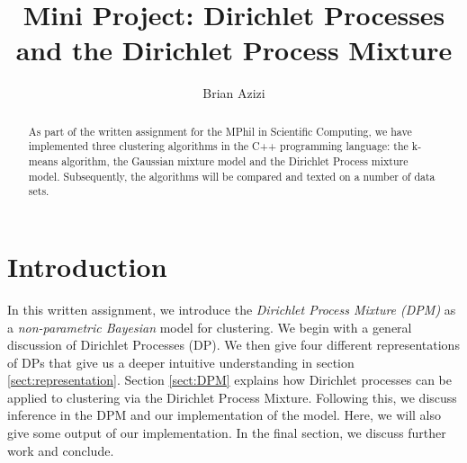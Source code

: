 \documentclass[final,3p,times,twocolumn]{elsarticle}
\begin{document}
\begin{frontmatter}



\title{Mini Project: Dirichlet Processes and the Dirichlet Process Mixture}


\author{Brian Azizi}

\address{Cavendish Laboratory, Department of Physics, J J Thomson
  Avenue, Cambridge. CB3 0HE}

\begin{abstract}
As part of the written assignment for the MPhil in Scientific Computing, we have implemented three clustering algorithms in the C++ programming language: the k-means algorithm, the Gaussian mixture model and the Dirichlet Process mixture model.
Subsequently, the algorithms will be compared and texted on a number of data sets.
\end{abstract}

\end{frontmatter}


\section{Introduction}
\label{sect:Intro}
In this written assignment, we introduce the \emph{Dirichlet Process Mixture (DPM)} as a \emph{non-parametric Bayesian} model for clustering.
We begin with a general discussion of Dirichlet Processes (DP).
We then give four different representations of DPs that give us a deeper intuitive understanding in section \ref{sect:representation}.
Section \ref{sect:DPM} explains how Dirichlet processes can be applied to clustering via the Dirichlet Process Mixture.
Following this, we discuss inference in the DPM and our implementation of the model.
Here, we will also give some output of our implementation.
In the final section, we discuss further work and conclude.
\end{document}
